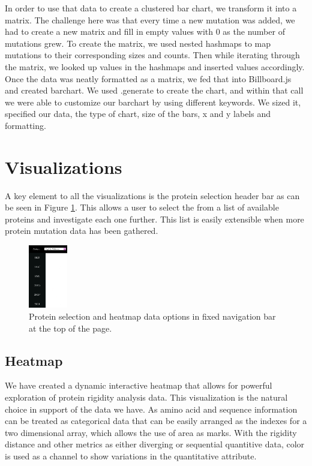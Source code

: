 \documentclass[11pt]{IEEEtran}
\begin{document}
In order to use that data to create a clustered bar chart, we transform it into a matrix. The challenge here was that every time a new mutation was added, we had to create a new matrix and fill in empty values with 0 as the number of mutations grew. To create the matrix, we used nested hashmaps to map mutations to their corresponding sizes and counts. Then while iterating through the matrix, we looked up values in the hashmaps and inserted values accordingly.\\

Once the data was neatly formatted as a matrix, we fed that into Billboard.js and created barchart. We used .generate to create the chart, and within that call we were able to customize our barchart by using different keywords. We sized it, specified our data, the type of chart, size of the bars, x and y labels and formatting.

\section{Visualizations}
A key element to all the visualizations is the protein selection header bar as can be seen in Figure \ref{fig:navbar}. This allows a user to select the from a list of available proteins and investigate each one further. This list is easily extensible when more protein mutation data has been gathered.
\begin{figure}[ht]
  \center
  \includegraphics[width=0.15\textwidth]{figs/navbar.png}
  \caption{Protein selection and heatmap data options in fixed navigation bar at the top of the page.}
  \label{fig:navbar}
\end{figure}
\subsection{Heatmap}\label{AA}
We have created a dynamic interactive heatmap that allows for powerful exploration of protein rigidity analysis data. This visualization is the natural choice in support of the data we have. As amino acid and sequence information can be treated as categorical data that can be easily arranged as the indexes for a two dimensional array, which allows the use of area as marks.  With the rigidity distance and other metrics as either diverging or sequential quantitive data, color is used as a channel to show variations in the quantitative attribute.\\
\end{document}
